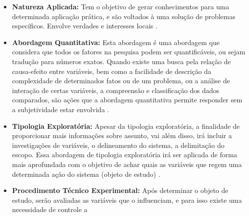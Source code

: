         \begin{itemize}
            \item \textbf{Natureza Aplicada:} Tem o objetivo de gerar conhecimentos para uma determinada aplicação prática, e
                                                                    são voltados à uma solução de problemas específicos. Envolve verdades e interesses
                                                                    locais \cite{prodanov2013}.
            \item \textbf{Abordagem Quantitativa:} Esta abordagem é uma abordagem que considera que todos os fatores na pesquisa
                                                                              podem ser quantificáveis, ou sejam tradução para números exatos. Quando existe
                                                                              uma busca pela relação de causa-efeito entre variáveis, bem como a facilidade de
                                                                              descrição da complexidade de determinados fatos ou de um problema, ou a análise
                                                                              de interação de certas variáveis, a compreensão e classificação dos dados comparados,
                                                                              são ações que a abordagem quantitativa permite responder sem a subjetividade estar
                                                                              envolvida \cite{prodanov2013}.
            \item \textbf{Tipologia Exploratória:} Apesar da tipologia exploratória, a finalidade de proporcionar mais informações sobre
                                                                          assunto, vai além disso, irá incluir a investigações de variáveis, o delineamento do
                                                                          sistema, a delimitação do escopo. Essa abordagem de tipologia exploratória irá ser
                                                                          aplicada de forma mais aprofundada com o objetivo de achar quais as variáveis que
                                                                          regem uma determinada ação do sistema (objeto de estudo) \cite{prodanov2013}.
            \item \textbf{Procedimento Técnico Experimental:} Após determinar o objeto de estudo, serão avaliadas as variáveis que
                                                                                                 o influenciam, e para isso existe uma necessidade de controle a

\end{itemize}
